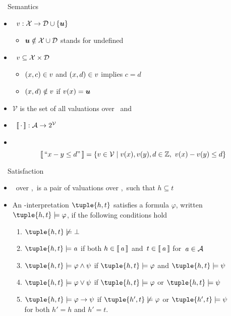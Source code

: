 \begin{frame}{\HTC\ \ Semantics}
  \begin{itemize}
  \item {} \ $v: \mathcal{X} \rightarrow {\ensuremath{\mathcal{D}}\cup \{\ensuremath{\boldsymbol{u}}\}}$
    \begin{itemize}
    \item $\boldsymbol{u} \notin \mathcal{X} \cup \mathcal{D}$ stands for undefined
    \end{itemize}
  \item<2->[]  \ $v \subseteq \mathcal{X} \times \mathcal{D}$
    \begin{itemize}
    \item $(x,c)\in v$ and $(x,d)\in v$ implies $c = d$
    \item $(x,d)\notin v$ if $v(x)=\boldsymbol{u}$
    \end{itemize}
  \item<2->[] $\mathcal{V}$ is the set of all valuations over \Variables\ and \Domain\
    \medskip
  \item<3->  \ $\llbracket \, \cdot \, \rrbracket: \mathcal{A} \rightarrow 2^{\mathcal{V}}$
  \item<4-> \structure{Example} \
    \[
    \llbracket \, \text{``}{x - y \leq d}\text{''} \, \rrbracket
    =
    \{v\in\mathcal{V}\mid v(x),v(y), d \in \mathbb{Z}, \ v(x)-v(y)\leq d\}
    \]
  \end{itemize}
\end{frame}
\begin{frame}{\HTC\ \ Satisfaction}
  \begin{itemize}
  \item {} \ over \Variables,\Domain\ is a pair 
    of valuations over \Variables,\Domain\ such that $h\subseteq t$
    \bigskip
  \item<2-> An \HTC-interpretation $\tuple{h,t}$ satisfies a formula $\varphi$,
    written $\tuple{h,t} \models \varphi$, if the following conditions hold
    \begin{enumerate}\normalsize
    \item $\tuple{h,t} \not\models \bot$
    \item $\tuple{h,t} \models \ThAt$ if both $h \in \llbracket \, \mathit{a} \, \rrbracket$ and~$t \in \llbracket \, \mathit{a} \, \rrbracket$ for~$\mathit{a} \in \mathcal{A}$
    \item $\tuple{h,t} \models \varphi \wedge \psi$ if $\tuple{h,t} \models \varphi$ and $\tuple{h,t} \models \psi$
    \item $\tuple{h,t} \models \varphi \vee \psi$ if $\tuple{h,t} \models \varphi$ or $\tuple{h,t} \models \psi$
    \item $\tuple{h,t} \models \varphi \to \psi$ if $\tuple{h',t} \not\models \varphi$ or $\tuple{h',t} \models \psi$
      \\ for both $h' = h$ and $h' = t$.
    \end{enumerate}
  \end{itemize}
\end{frame}
